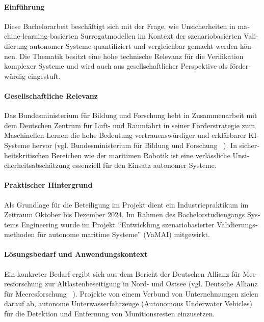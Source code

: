 \begin{otherlanguage}{ngerman}
\paragraph{Einführung} Diese Bachelorarbeit beschäftigt sich mit der Frage, wie Unsicherheiten in machine-learning-basierten Surrogatmodellen im Kontext der szenariobasierten Validierung autonomer Systeme quantifiziert und vergleichbar gemacht werden können. Die Thematik besitzt eine hohe technische Relevanz für die Verifikation komplexer Systeme und wird auch aus gesellschaftlicher Perspektive als förderwürdig eingestuft.

\paragraph{Gesellschaftliche Relevanz} Das \gls{Bundesministerium für Bildung und Forschung} hebt in Zusammenarbeit mit dem \gls{Deutschen Zentrum für Luft- und Raumfahrt} in seiner Förderstrategie zum Maschinellen Lernen die hohe Bedeutung vertrauenswürdiger und erklärbarer KI-Systeme hervor (vgl. Bundesministerium für Bildung und Forschung ~\parencite{bmbf2025}). In sicherheitskritischen Bereichen wie der maritimen Robotik ist eine verlässliche Unsicherheitsabschätzung essenziell für den Einsatz autonomer Systeme.

\paragraph{Praktischer Hintergrund} Als Grundlage für die Beteiligung im Projekt dient ein Industriepraktikum im Zeitraum Oktober bis Dezember 2024. Im Rahmen des Bachelorstudiengangs Systems Engineering wurde im Projekt \enquote{Entwicklung szenariobasierter Validierungsmethoden für autonome maritime Systeme} (VaMAI) mitgewirkt. 

\paragraph{Lösungsbedarf und Anwendungskontext} Ein konkreter Bedarf ergibt sich aus dem Bericht der \gls{Deutschen Allianz für Meeresforschung} zur Altlastenbeseitigung in Nord- und Ostsee (vgl. Deutsche Allianz für Meeresforschung ~\parencite{dam2024}). Projekte von einem Verbund von Unternehmungen zielen darauf ab, autonome Unterwasserfahrzeuge (\gls{Autonomous Underwater Vehicle}s) für die Detektion und Entfernung von Munitionsresten einzusetzen. 



\end{otherlanguage}
